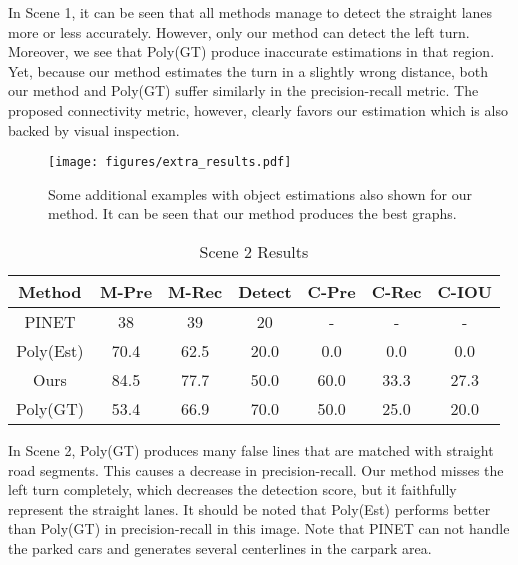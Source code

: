 \documentclass[10pt,twocolumn,letterpaper]{article}
\begin{document}
In Scene 1, it can be seen that all methods manage to detect the straight lanes more or less accurately. However, only our method can detect the left turn. Moreover, we see that Poly(GT) produce inaccurate estimations in that region. Yet, because our method estimates the turn in a slightly wrong distance, both our method and Poly(GT) suffer similarly in the precision-recall metric. The proposed connectivity metric, however, clearly favors our estimation which is also backed by visual inspection.



\begin{figure*}
    \centering
    \texttt{[image: figures/extra\_results.pdf]}
    \caption{Some additional examples with object estimations also shown for our method. It can be seen that our method produces the best graphs.}
    \label{fig:extra}
\end{figure*}





\begin{table}[h]
\begin{center}
\tabcolsep=0.08cm
\begin{tabular}{ |c|c|c|c|c|c|c| }

\hline
Method & M-Pre & M-Rec & Detect & C-Pre & C-Rec & C-IOU  \\
\hline

PINET & 38& 39&20& -& - &- \\ 

Poly(Est) &  70.4&62.5&20.0&0.0& 0.0& 0.0 \\

Ours&  84.5& 77.7& 50.0&  60.0& 33.3& 27.3 \\
\hline
Poly(GT) & 53.4& 66.9& 70.0& 50.0&25.0&20.0 \\
\hline
\end{tabular}
\end{center}
\vspace{-1em}
\caption{Scene 2 Results}
\label{tab:imagewise_compare2}
\end{table}

In Scene 2, Poly(GT) produces many false lines that are matched with straight road segments. This causes a decrease in precision-recall. Our method misses the left turn completely, which decreases the detection score, but it faithfully represent the straight lanes. It should be noted that Poly(Est) performs better than Poly(GT) in precision-recall in this image. Note that PINET can not handle the parked cars and generates several centerlines in the carpark area. 
\end{document}
